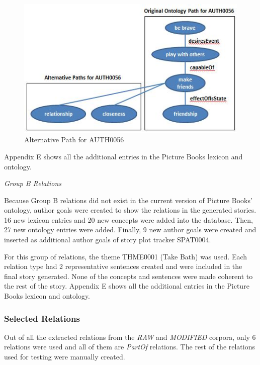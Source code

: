 \begin{figure}[h]                %
   \centering                    %
   \includegraphics{altpatheffectofisstate.jpg}      %
   \caption{Alternative Path for AUTH0056}
    \label{fig:altpatheffectofisstate}
\end{figure}

Appendix E shows all the additional entries in the Picture Books lexicon and ontology.

\emph{Group B Relations}

Because Group B relations did not exist in the current version of Picture Books' ontology, author goals were created to show the relations in the generated stories. 16 new lexicon entries and 20 new concepts were added into the database. Then, 27 new ontology entries were added. Finally, 9 new author goals were created and inserted as additional author goals of story plot tracker SPAT0004. 

For this group of relations, the theme THME0001 (Take Bath) was used. Each relation type had 2 representative sentences created and were included in the final story generated. None of the concepts and sentences were made coherent to the rest of the story. Appendix E shows all the additional entries in the Picture Books lexicon and ontology.

\subsubsection*{Selected Relations}
\label{sec:selectedrelations}

Out of all the extracted relations from the \textit{RAW} and \textit{MODIFIED} corpora, only 6 relations were used and all of them are \textit{PartOf} relations. The rest of the relations used for testing were manually created. 

